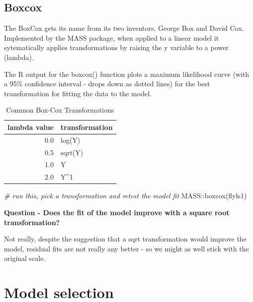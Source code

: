 \documentclass[
]{book}
\makeatletter
\newenvironment{Shaded}{\begin{snugshade}}{\end{snugshade}}
\newcommand{\CommentTok}[1]{\textcolor[rgb]{0.56,0.35,0.01}{\textit{#1}}}
\newcommand{\FunctionTok}[1]{\textcolor[rgb]{0.00,0.00,0.00}{#1}}
\newcommand{\NormalTok}[1]{#1}
\newcommand{\SpecialCharTok}[1]{\textcolor[rgb]{0.00,0.00,0.00}{#1}}
\newenvironment{kframe}{%
\medskip{}
\setlength{\fboxsep}{.8em}
 \def\at@end@of@kframe{}%
 \ifinner\ifhmode%
  \def\at@end@of@kframe{\end{minipage}}%
  \begin{minipage}{\columnwidth}%
 \fi\fi%
 \def\FrameCommand##1{\hskip\@totalleftmargin \hskip-\fboxsep
 \colorbox{shadecolor}{##1}\hskip-\fboxsep
     \hskip-\linewidth \hskip-\@totalleftmargin \hskip\columnwidth}%
 \MakeFramed {\advance\hsize-\width
   \@totalleftmargin\z@ \linewidth\hsize
   \@setminipage}}%
 {\par\unskip\endMakeFramed%
 \at@end@of@kframe}
\newenvironment{block}[1]
  {
  \begin{itemize}
  \renewcommand{\labelitemi}{
    \raisebox{-.7\height}[0pt][0pt]{
      {\setkeys{Gin}{width=3em,keepaspectratio}\texttt{[image: images/\#1]}}
    }
  }
  \setlength{\fboxsep}{1em}
  \begin{kframe}
  \item
  }
  {
  \end{kframe}
  \end{itemize}
  }
\newenvironment{rmdnote}
  {\begin{block}{note}}
  {\end{block}}
\makeatother
\begin{document}
\hypertarget{boxcox}{%
\subsection{Boxcox}\label{boxcox}}

\begin{rmdnote}
The BoxCox gets its name from its two inventors, George Box and David
Cox. Implemented by the MASS package, when applied to a linear model it
sytematically applies transformations by raising the y variable to a
power (lambda).

The R output for the boxcox() function plots a maximum likelihood curve
(with a 95\% confidence interval - drops down as dotted lines) for the
best transformation for fitting the data to the model.
\end{rmdnote}

\begin{table}

\caption{\label{tab:unnamed-chunk-521}Common Box-Cox Transformations}
\centering
\fontsize{16}{18}\selectfont
\begin{tabular}[t]{rl}
\toprule
lambda value & transformation\\
\midrule
0.0 & log(Y)\\
0.5 & sqrt(Y)\\
1.0 & Y\\
2.0 & Y\textasciicircum{}1\\
\bottomrule
\end{tabular}
\end{table}

\begin{Shaded}
\begin{Highlighting}[]
\CommentTok{\# run this, pick a transformation and retest the model fit}
\NormalTok{MASS}\SpecialCharTok{::}\FunctionTok{boxcox}\NormalTok{(flyls1)}
\end{Highlighting}
\end{Shaded}

\textbf{Question - Does the fit of the model improve with a square root transformation?}

Not really, despite the suggestion that a sqrt transformation would improve the model, residual fits are not really any better - so we might as well stick with the original scale.

\hypertarget{model-selection}{%
\section{Model selection}\label{model-selection}}
\end{document}
